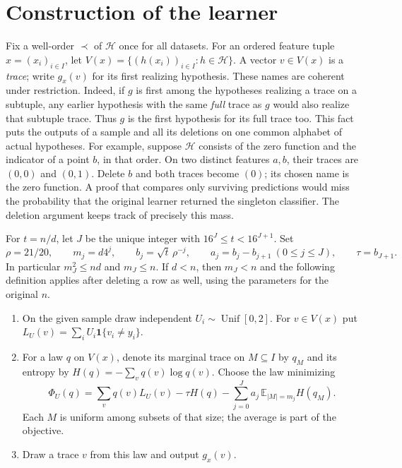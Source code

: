\documentclass[11pt]{article}
\theoremstyle{definition}\newtheorem{definition}[theorem]{Definition}
\newcommand{\E}{\mathbb E}
\newcommand{\HH}{\mathcal H}
\newcommand{\ind}{\mathbf 1}
\begin{document}
\section{Construction of the learner}\label{sec:learner}
Fix a well-order $\prec$ of $\HH$ once for all datasets. For an ordered feature
tuple $x=(x_i)_{i\in I}$, let $V(x)=\{(h(x_i))_{i\in I}:h\in\HH\}$.
A vector $v\in V(x)$ is a \emph{trace}; write $g_x(v)$ for its first
realizing hypothesis. These names are coherent under restriction. Indeed,
if $g$ is first among the hypotheses realizing a trace on a subtuple, any
earlier hypothesis with the same \emph{full} trace as $g$ would also realize
that subtuple trace. Thus $g$ is the first hypothesis for its full trace too.
This fact puts the outputs of a sample and all its deletions on one common
alphabet of actual hypotheses. For example, suppose $\HH$ consists of the
zero function and the indicator of a point $b$, in that order. On two
distinct features $a,b$, their traces are $(0,0)$ and $(0,1)$. Delete $b$
and both traces become $(0)$; its chosen name is the zero function. A proof
that compares only surviving predictions would miss the probability that
the original learner returned the singleton classifier. The deletion
argument keeps track of precisely this mass.

For $t=n/d$, let $J$ be the unique integer with $16^J\le t<16^{J+1}$.
Set
\[
 \rho=21/20,\qquad m_j=d4^j,\qquad b_j=\sqrt{t}\,\rho^{-j},\qquad
 a_j=b_j-b_{j+1}\ (0\le j\le J),\qquad \tau=b_{J+1}.
\]
In particular $m_J^2\le nd$ and $m_J\le n$. If $d<n$, then $m_J<n$ and the
following definition applies after deleting a row as well, using the
parameters for the original $n$.

\begin{enumerate}
\item On the given sample draw independent $U_i\sim\operatorname{Unif}[0,2]$.
For $v\in V(x)$ put $L_U(v)=\sum_i U_i\ind\{v_i\ne y_i\}$.
\item For a law $q$ on $V(x)$, denote its marginal trace on $M\subseteq I$
by $q_M$ and its entropy by $H(q)=-\sum_v q(v)\log q(v)$.
Choose the law minimizing
\begin{equation}
 \Phi_U(q)=\sum_v q(v)L_U(v)-\tau H(q)
             -\sum_{j=0}^J a_j\,\E_{|M|=m_j} H(q_M).
 \label{eq:objective}
\end{equation}
Each $M$ is uniform among subsets of that size; the average is part of the
objective.
\item Draw a trace $v$ from this law and output $g_x(v)$.
\end{enumerate}
\end{document}
